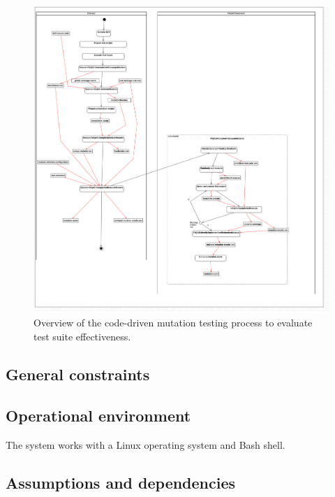 \begin{figure}[h]
  \centering
	\includegraphics[width=15cm]{images/png/Activity1!CodeDrivenTestSuiteEvaluation_1.png}
      \caption{Overview of the code-driven mutation testing process to evaluate test suite effectiveness.}
      \label{fig:process:codeDriven:evaluation}
\end{figure}


\clearpage

\subsection{General constraints}


\clearpage

\subsection{Operational environment}

\RQ{} The system works with a Linux operating system and Bash shell.



\subsection{Assumptions and dependencies}

